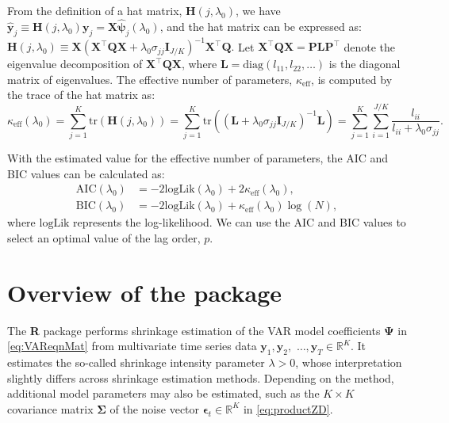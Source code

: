 From the definition of a hat matrix, \(\mathbf{H}(j, \lambda_0)\), we have \(\widehat{\mathbf{y}}_j \equiv \mathbf{H}(j, \lambda_0) \mathbf{y}_j = \mathbf{X} \widehat{\boldsymbol\psi}_j(\lambda_0)\),
and the hat matrix can be expressed as: \(\mathbf{H}(j, \lambda_0) \equiv
  \mathbf{X} \left( \mathbf{X}^\top \mathbf{Q} \mathbf{X} + \lambda_0 \sigma_{jj} \mathbf{I}_{J/K} \right)^{-1} \mathbf{X}^\top \mathbf{Q}.\)
Let \(\mathbf{X}^\top \mathbf{Q} \mathbf{X} = \mathbf{P} \mathbf{L} \mathbf{P}^\top\) denote the eigenvalue decomposition of \(\mathbf{X}^\top \mathbf{Q} \mathbf{X}\), where \(\mathbf{L} = \text{diag}(l_{11}, l_{22}, \ldots)\) is the diagonal matrix of eigenvalues.
The effective number of parameters, \(\kappa_\text{eff}\), is computed by the trace of the hat matrix as:
\begin{equation}
\kappa_\text{eff} (\lambda_0) = \sum_{j=1}^K \text{tr}\left( \mathbf{H}(j, \lambda_0) \right) = \sum_{j=1}^K \text{tr}\left( \left(\mathbf{L} + \lambda_0 \sigma_{jj} \mathbf{I}_{J/K} \right)^{-1} \mathbf{L} \right) = \sum_{j=1}^K \sum_{i=1}^{J/K} \frac{l_{ii}}{l_{ii} + \lambda_0 \sigma_{jj}}.
\end{equation}

With the estimated value for the effective number of parameters, the AIC and BIC values can be calculated as:
\begin{equation}
\begin{split}
\text{AIC}(\lambda_0) &= -2 \text{logLik} (\lambda_0) + 2 \kappa_\text{eff} (\lambda_0), \\
\text{BIC}(\lambda_0) &= -2 \text{logLik} (\lambda_0) + \kappa_\text{eff} (\lambda_0) \log(N),
\end{split}
\end{equation}
where \(\text{logLik}\) represents the log-likelihood.
We can use the AIC and BIC values to select an optimal value of the lag order, \(p\).

\section{Overview of the package}\label{overview-of-the-package}

The \textbf{R} package  performs shrinkage estimation of the VAR model
coefficients \(\boldsymbol\Psi\) in \eqref{eq:VAReqnMat}
from multivariate time series data \(\mathbf{y}_1, \mathbf{y}_2,\) \(\ldots, \mathbf{y}_T \in \mathbb{R}^K\).
It estimates the so-called shrinkage intensity parameter \(\lambda > 0\), whose interpretation slightly differs across shrinkage estimation methods. Depending on the method, additional model parameters may also be estimated, such as the \(K\times K\) covariance matrix \(\mathbf{\Sigma}\) of the noise vector \(\boldsymbol\epsilon_t \in \mathbb{R}^K\) in \eqref{eq:productZD}.

